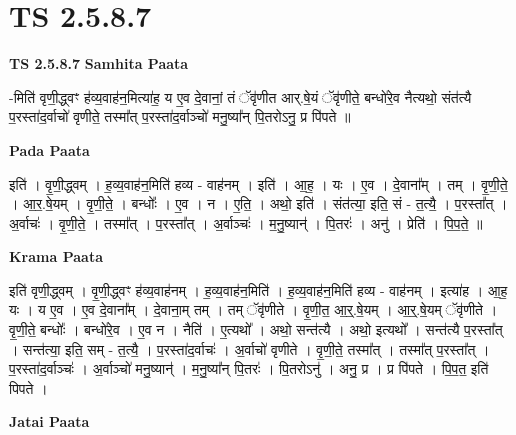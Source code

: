 \documentclass[17pt]{extarticle}
\begin{document}
\section*{ TS 2.5.8.7 }

\textbf{TS 2.5.8.7 } \newline
\textbf{Samhita Paata} \newline

-मिति॑ वृणी॒द्ध्वꣳ ह॑व्य॒वाह॑न॒मित्या॑ह॒ य ए॒व दे॒वानां॒ तं ॅवृ॑णीत आर्.षे॒यं ॅवृ॑णीते॒ बन्धो॑रे॒व नैत्यथो॒ संत॑त्यै प॒रस्ता॑द॒र्वाचो॑ वृणीते॒ तस्मा᳚त् प॒रस्ता॑द॒र्वाञ्चो॑ मनु॒ष्या᳚न् पि॒तरोऽनु॒ प्र पि॑पते ॥ \newline

\textbf{Pada Paata} \newline

इति॑ । वृ॒णी॒द्ध्वम् । ह॒व्य॒वाह॑न॒मिति॑ हव्य - वाह॑नम् । इति॑ । आ॒ह॒ । यः । ए॒व । दे॒वाना᳚म् । तम् । वृ॒णी॒ते॒ । आ॒र॒.षे॒यम् । वृ॒णी॒ते॒ । बन्धोः᳚ । ए॒व । न । ए॒ति॒ । अथो॒ इति॑ । संत॑त्या॒ इति॒ सं - त॒त्यै॒ । प॒रस्ता᳚त् । अ॒र्वाचः॑ । वृ॒णी॒ते॒ । तस्मा᳚त् । प॒रस्ता᳚त् । अ॒र्वाञ्चः॑ । म॒नु॒ष्यान्॑ । पि॒तरः॑ । अनु॑ । प्रेति॑ । पि॒प॒ते॒ ॥  \newline


\textbf{Krama Paata} \newline

इति॑ वृणी॒द्ध्वम् । वृ॒णी॒द्ध्वꣳ ह॑व्य॒वाह॑नम् । ह॒व्य॒वाह॑न॒मिति॑ । ह॒व्य॒वाह॑न॒मिति॑ हव्य - वाह॑नम् । इत्या॑ह । आ॒ह॒ यः । य ए॒व । ए॒व दे॒वाना᳚म् । दे॒वाना॒म् तम् । तम् ॅवृ॑णीते । वृ॒णी॒त॒ आ॒र्॒.षे॒यम् । आ॒र्॒.षे॒यम् ॅवृ॑णीते । वृ॒णी॒ते॒ बन्धोः᳚ । बन्धो॑रे॒व । ए॒व न । नैति॑ । ए॒त्यथो᳚ । अथो॒ सन्त॑त्यै । अथो॒ इत्यथो᳚ । सन्त॑त्यै प॒रस्ता᳚त् । सन्त॑त्या॒ इति॒ सम् - त॒त्यै॒ । प॒रस्ता॑द॒र्वाचः॑ । अ॒र्वाचो॑ वृणीते । वृ॒णी॒ते॒ तस्मा᳚त् । तस्मा᳚त् प॒रस्ता᳚त् । प॒रस्ता॑द॒र्वाञ्चः॑ । अ॒र्वाञ्चो॑ मनु॒ष्यान्॑ । म॒नु॒ष्या᳚न् पि॒तरः॑ । पि॒तरोऽनु॑ । अनु॒ प्र । प्र पि॑पते । पि॒प॒त॒ इति॑ पिपते । \newline

\textbf{Jatai Paata} \newline
\end{document}
